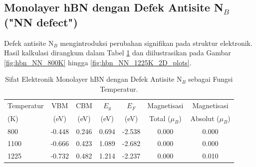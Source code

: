 \subsection{Monolayer hBN dengan Defek Antisite N$_B$ ("NN defect")}
\label{subsec:hbn_defek_nb}
Defek antisite N$_B$ mengintroduksi perubahan signifikan pada struktur elektronik. Hasil kalkulasi dirangkum dalam Tabel \ref{tab:hbn_defek_nb} dan diilustrasikan pada Gambar \ref{fig:hbn_NN_800K} hingga \ref{fig:hbn_NN_1225K_2D_plots}.

\begin{table}[h!]
  \centering
  \caption{Sifat Elektronik Monolayer hBN dengan Defek Antisite N$_B$ sebagai Fungsi Temperatur.}
  \label{tab:hbn_defek_nb}
  \begin{tabular}{lcccccc}
    \toprule
    Temperatur & VBM & CBM & $E_g$ & $E_F$ & Magnetisasi & Magnetisasi \\
    (K) & (eV) & (eV) & (eV) & (eV) & Total ($\mu_B$) & Absolut ($\mu_B$) \\
    \midrule
    800  & -0.448 &  0.246 & 0.694 & -2.538 & 0.000 & 0.000 \\
    1100 & -0.666 &  0.423 & 1.089 & -2.682 & 0.000 & 0.000 \\
    1225 & -0.732 &  0.482 & 1.214 & -2.237 & 0.000 & 0.010 \\
    \bottomrule
  \end{tabular}
\end{table}

